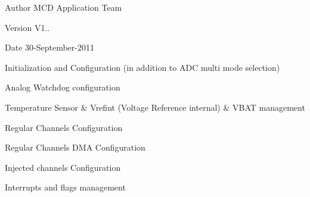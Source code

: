 \begin{DoxyAuthor}{Author}
M\+CD Application Team 
\end{DoxyAuthor}
\begin{DoxyVersion}{Version}
V1.. 
\end{DoxyVersion}
\begin{DoxyDate}{Date}
30-\/\+September-\/2011
\begin{DoxyItemize}
\item Initialization and Configuration (in addition to A\+DC multi mode selection)
\item Analog Watchdog configuration
\item Temperature Sensor \& Vrefint (Voltage Reference internal) \& V\+B\+AT management
\item Regular Channels Configuration
\item Regular Channels D\+MA Configuration
\item Injected channels Configuration
\item Interrupts and flags management
\end{DoxyItemize}
\end{DoxyDate}
